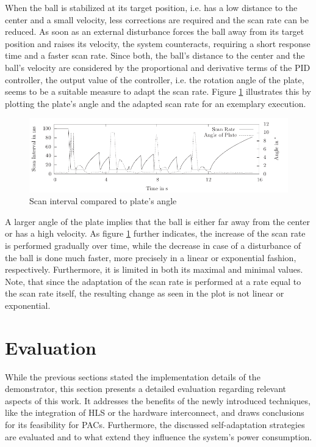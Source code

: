 When the ball is stabilized at its target position, i.e. has a low distance to
the center and a small velocity, less corrections are required and the scan
rate can be reduced. As soon as an external disturbance forces the ball away
from its target position and raises its velocity, the system counteracts,
requiring a short response time and a faster scan rate. Since both, the ball's
distance to the center and the ball's velocity are considered by the
proportional and derivative terms of the \ac{PID} controller, the output value
of the controller, i.e. the rotation angle of the plate, seems to be a
suitable measure to adapt the scan rate. Figure \ref{fig:selfadapt_a}
illustrates this by plotting the plate's angle and the adapted scan rate for
an exemplary execution.
\begin{figure}
	\centering
	\includegraphics{../figures/selfadapt_a}
	\caption{Scan interval compared to plate's angle}
	\label{fig:selfadapt_a}
\end{figure}
A larger angle of the plate implies that the ball is either far away from the
center or has a high velocity. As figure \ref{fig:selfadapt_a} further
indicates, the increase of the scan rate is performed gradually over time,
while the decrease in case of a disturbance of the ball is done much faster,
more precisely in a linear or exponential fashion, respectively. Furthermore,
it is limited in both its maximal and minimal values. Note, that since the
adaptation of the scan rate is performed at a rate equal to the scan rate
itself, the resulting change as seen in the plot is not linear or exponential.

\section{Evaluation}
While the previous sections stated the implementation details of the
demonstrator, this section presents a detailed evaluation regarding relevant
aspects of this work. It addresses the benefits of the newly introduced
techniques, like the integration of \ac{HLS} or the hardware interconnect, and
draws conclusions for its feasibility for \acp{PAC}. Furthermore, the
discussed self-adaptation strategies are evaluated and to what extend they
influence the system's power consumption.

